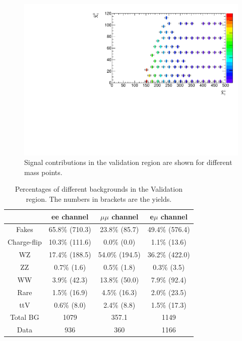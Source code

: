 \begin{figure}[htbp]
\begin{center}
\includegraphics[width=\textwidth]{data/plot/DataFakes/FakeEff/signal_contamination.pdf}
\caption{Signal contributions in the validation region are shown for different mass points.}
\label{fig:signal_contribution}
\end{center}
\end{figure}

\begin{table}[htbp]
\begin{center}
\begin{tabular}{|c|c|c|c|}
\hline
\hline
& ee channel & $\mu\mu$ channel & e$\mu$ channel\\
\hline
\hline
Fakes       & 65.8\% (710.3) & 23.8\% (85.7)  & 49.4\% (576.4)\\
Charge-flip & 10.3\% (111.6) &  0.0\% (0.0)   &  1.1\% (13.6)\\
WZ          & 17.4\% (188.5) & 54.0\% (194.5) & 36.2\% (422.0)\\
ZZ          &  0.7\% (1.6)   &  0.5\% (1.8)   &  0.3\% (3.5)\\
WW          &  3.9\% (42.3)  & 13.8\% (50.0)  &  7.9\% (92.4)\\
Rare        &  1.5\% (16.9)  &  4.5\% (16.3)  &  2.0\% (23.5)\\
ttV         &  0.6\% (8.0)   &  2.4\% (8.8)   &  1.5\% (17.3)\\
\hline
Total BG    & 1079           & 357.1          & 1149\\
\hline
Data        &  936           &  360           & 1166\\
\hline
\end{tabular}
\caption{Percentages of different backgrounds in the Validation region. The numbers in brackets are the yields.}
\label{tab:VRfakes_compos}
\end{center}
\end{table}

